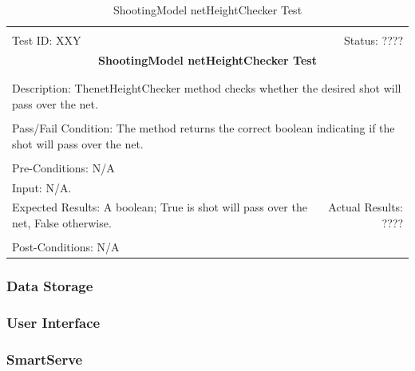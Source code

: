 \documentclass[11pt]{article}
\begin{document}
\begin{center}
\begin{table}[H]
\begin{tabular}{|l r|}\hline&\\[-2mm]
	Test ID: XXY	&Status: ????\\[-3mm]
	\multicolumn{2}{|c|}{\textbf{\large{ShootingModel netHeightChecker Test}}}\\&\\\hline&\\[-3mm]
	\multicolumn{2}{|p{\textwidth}|}{Description: ThenetHeightChecker method checks whether the desired shot will pass over the net.}\\[1mm]\hline&\\[-3mm]
	\multicolumn{2}{|p{\textwidth}|}{Pass/Fail Condition: The method returns the correct boolean indicating if the shot will pass over the net.}\\[1mm]\hline&\\[-3mm]
	\multicolumn{2}{|p{\textwidth}|}{Pre-Conditions: N/A}\\[4mm]
	\multicolumn{2}{|p{\textwidth}|}{Input: N/A.}\\[2mm]\hline
	\multicolumn{1}{|p{0.49\textwidth}}{Expected Results: A boolean; True is shot will pass over the net, False otherwise.}	&\multicolumn{1}{|p{0.45\textwidth}|}{Actual Results: ????}\\\hline&\\[-3mm]
	\multicolumn{2}{|p{\textwidth}|}{Post-Conditions: N/A}\\\hline
\end{tabular}
\caption{ShootingModel netHeightChecker Test}
\end{table}
\end{center}

\subsubsection{Data Storage}
\subsubsection{User Interface}
\subsubsection{SmartServe}
\end{document}
